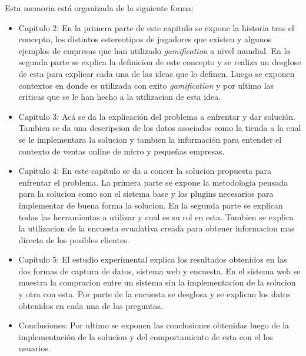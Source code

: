 Esta memoria está organizada de la siguiente forma:
\begin{itemize}
\item Capitulo 2: En la primera parte de este capitulo se expone la historia tras 
el concepto, los distintos  estereotipos de jugadores que existen y algunos ejemplos de empresas que han 
utilizado \emph{gamification} a nivel mundial. En la segunda parte se explica la definicion de este 
concepto y se realiza un desglose de esta para explicar cada una de las ideas que lo definen. Luego se 
exponen contextos en donde es utilizada con exito \emph{gamification} y por ultimo las criticas que
se le han hecho a la utilizacion de esta idea.

\item Capitulo 3: Acá se da la explicación del problema a enfrentar y dar solución. Tambien se da una
descripcion de los datos asociados como la tienda a la cual se le implementara la solucion y tambien 
la información para entender el contexto de ventas online de micro y pequeñas empresas. 

\item Capitulo 4: En este capitulo se da a concer la solucion propuesta para enfrentar el problema. La 
primera parte se expone la metodologia pensada para la solucion como son el sistema base y los plugins
necesarios para implementar de buena forma la solucion. En la segunda parte se explican todas las 
herramientas a utilizar y cual es su rol en esta. Tambien se explica la utilizacion de la encuesta 
evualativa creada para obtener informacion mas directa de los posibles clientes.

\item Capitulo 5: El estudio experimental explica los resultados obtenidos en las dos formas de 
captura de datos, sistema web y encuesta. En el sistema web se muestra la compracion entre un sistema
sin la implementacion de la solucion y otra con esta. Por parte de la encuesta se desglosa y se 
explican los datos obtenidos en cada una de las preguntas.

\item Conclusiones: Por ultimo se exponen las conclusiones obtenidas luego de la implementación de la 
solucion y del comportamiento de esta con el los usuarios.
\end{itemize}
